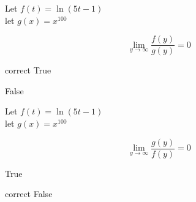 \documentclass{ximera}
\author{Lee Wayand}
\begin{document}
\begin{exercise}




\begin{question}


Let $f(t) = \ln(5t-1)$ \\

let $g(x) = x^{100}$



\[
\lim\limits_{y \to \infty}\frac{f(y)}{g(y)} = 0
\]


\begin{multipleChoice}
\item [correct]{True}
\item {False}
\end{multipleChoice}


\end{question}







\begin{question}

Let $f(t) = \ln(5t-1)$ \\

let $g(x) = x^{100}$



\[
\lim\limits_{y \to \infty}\frac{g(y)}{f(y)} = 0
\]


\begin{multipleChoice}
\item {True}
\item [correct]{False}
\end{multipleChoice}


\end{question}









\end{exercise}
\end{document}
